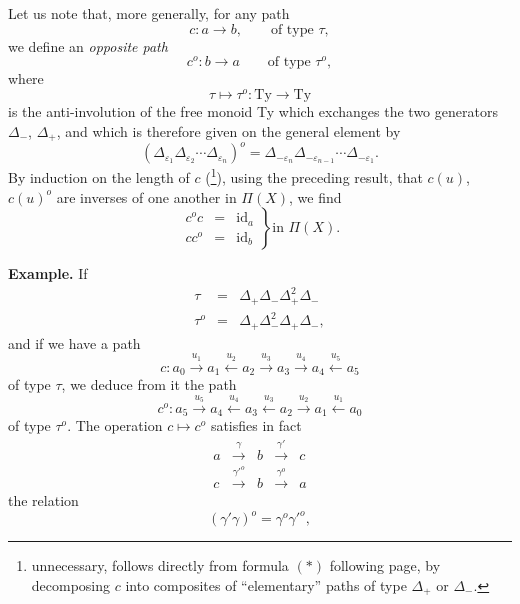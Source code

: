 Let us note that, more generally, for any path
\[
c : a \longrightarrow b, \qquad \text{of type } \tau,
\]
we define an \textit{opposite path}
\[
c^o : b \longrightarrow a \qquad \text{of type } \tau^o,
\]
where
\[
\tau \longmapsto \tau^o : \mathrm{Ty} \longrightarrow \mathrm{Ty}
\]
is the anti-involution of the free monoid Ty which exchanges the two generators $\Delta_-$, $\Delta_+$, and which is therefore given on the general element by
\[
(\Delta_{\varepsilon_1}\Delta_{\varepsilon_2}\cdots\Delta_{\varepsilon_n})^o = \Delta_{-\varepsilon_n}\Delta_{-\varepsilon_{n-1}}\cdots\Delta_{-\varepsilon_1}.
\]
By induction on the length of $c$ (\footnote[18]{unnecessary, follows directly from formula $(*)$ following page, by decomposing $c$ into composites of ``elementary'' paths of type $\Delta_+$ or $\Delta_-$.}), using the preceding result, that $c(u)$, $c(u)^o$ are inverses of one another in $\Pi(X)$, we find
\[
\left.
\begin{array}{rcl}
c^o c & = & \mathrm{id}_a\\
c c^o & = & \mathrm{id}_b
\end{array}
\right\}\text{in } \Pi(X).
\]

\textbf{Example.} If
\[
\begin{array}{rcl}
\tau & = & \Delta_+\Delta_-\Delta_+^2\Delta_-\\
\tau^o & = & \Delta_+\Delta_-^2\Delta_+\Delta_-,
\end{array}
\]
and if we have a path
\[
c : a_0 \xrightarrow{u_1} a_1 \xleftarrow{u_2} a_2 \xrightarrow{u_3} a_3 \xrightarrow{u_4} a_4 \xleftarrow{u_5} a_5
\]
of type $\tau$, we deduce from it the path
\[
c^o : a_5 \xrightarrow{u_5} a_4 \xleftarrow{u_4} a_3 \xleftarrow{u_3} a_2 \xrightarrow{u_2} a_1 \xleftarrow{u_1} a_0
\]
of type $\tau^o$. The operation $c \longmapsto c^o$ satisfies in
fact 
\[
\begin{array}{ccccc}
a & \xrightarrow{\gamma} & b & \xrightarrow{\gamma'} & c\\
c & \xrightarrow{\gamma'^o} & b & \xrightarrow{\gamma^o} & a
\end{array}
\]
the relation
\[
(\gamma'\gamma)^o = \gamma^o\gamma'^o, \tag*{$(*)$}
\]
